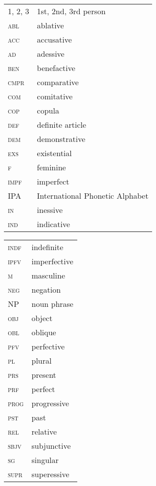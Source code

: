 \documentclass[output=paper]{langsci/langscibook}
\begin{document}
\begin{tabularx}{.45\textwidth}{lQ}
\textsc{1, 2, 3} & 1st, 2nd, 3rd person \\
\textsc{abl} & ablative \\
\textsc{acc} & accusative \\
\textsc{ad} & adessive \\
\textsc{ben} & benefactive \\
\textsc{cmpr} & comparative \\
\textsc{com} & comitative \\
\textsc{cop} & copula \\
\textsc{def} & definite article \\
\textsc{dem} & demonstrative \\
\textsc{exs} & existential \\
\textsc{f} & feminine \\
\textsc{impf} & imperfect \\
IPA & International Phonetic Alphabet\\
\textsc{in} & inessive \\
\textsc{ind} & indicative \\
\end{tabularx}
\begin{tabularx}{.45\textwidth}{lQ}
\textsc{indf} & indefinite \\
\textsc{ipfv} & imperfective \\
\textsc{m} & masculine \\
\textsc{neg} & negation \\
NP & noun phrase \\
\textsc{obj} & object \\
\textsc{obl} & oblique \\
\textsc{pfv} & perfective \\
\textsc{pl} & plural \\
\textsc{prs} & present \\
\textsc{prf} & perfect \\
\textsc{prog} & progressive \\
\textsc{pst} & past \\
\textsc{rel} & relative \\
\textsc{sbjv} & subjunctive \\
\textsc{sg} & singular \\
\textsc{supr} & superessive \\
\end{tabularx}


\sloppy\printbibliography[heading=subbibliography,notkeyword=this]
\end{document}
